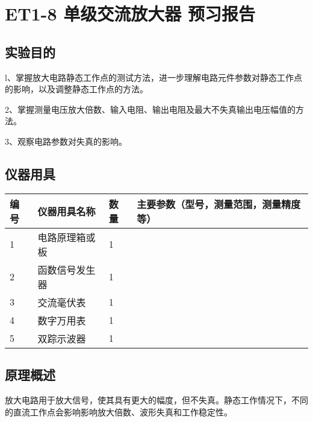 \documentclass[dvipsnames, svgnames,a4paper,11pt]{article}
\begin{document}
	
	
	
	\setcounter{section}{0}
	\section{ET1-8 单级交流放大器 \quad\heiti 预习报告}
	
	\subsection{实验目的}
	l、掌握放大电路静态工作点的测试方法，进一步理解电路元件参数对静态工作点的影响，以及调整静态工作点的方法。
	
	2、掌握测量电压放大倍数、输入电阻、输出电阻及最大不失真输出电压幅值的方法。
	
	3、观察电路参数对失真的影响。
	
	
	\subsection{仪器用具}
	\begin{table}[htbp]
		\centering
		\renewcommand\arraystretch{1.6}
		\begin{tabular}{p{}|p{}|p{}|p{}}
			\hline
			编号& 仪器用具名称 & 数量 &  主要参数（型号，测量范围，测量精度等） \\
			\hline
			1&  电路原理箱或板& 1 &  \\
			\hline
			2&  函数信号发生器& 1 &  \\
			\hline
			3&  交流毫伏表& 1 &  \\
			\hline
			4&  数字万用表& 1 &  \\
			\hline
			5&  双踪示波器& 1 &  \\
			\hline
		\end{tabular}
	\end{table}
	
	\subsection{原理概述}

	
		放大电路用于放大信号，使其具有更大的幅度，但不失真。静态工作情况下，不同的直流工作点会影响影响放大倍数、波形失真和工作稳定性。
	
\end{document}
